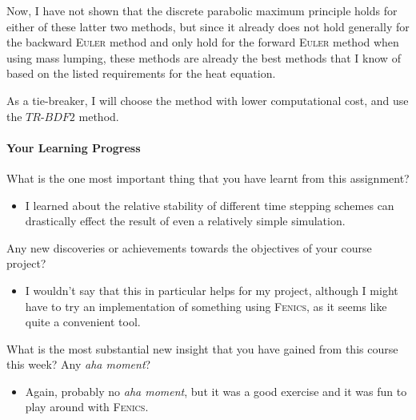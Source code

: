 \begin{solution}
Now, I have not shown that the discrete parabolic maximum principle holds for either of these latter two methods, but since it already does not hold generally for the backward \textsc{Euler} method and only hold for the forward \textsc{Euler} method when using mass lumping, these methods are already the best methods that I know of based on the listed requirements for the heat equation.

As a tie-breaker, I will choose the method with lower computational cost, and use the $TR\text{-}BDF2$ method.

\end{solution}

\newpage
\paragraph*{Your Learning Progress}%

What is the one most important thing that you have learnt from this assignment?

\vspace*{3mm}
\begin{itemize}
\item I learned about the relative stability of different time stepping schemes can drastically effect the result of even a relatively simple simulation.
\end{itemize}

\vspace*{8mm}

Any new discoveries or achievements towards the objectives of your course project?

\vspace*{3mm}
\begin{itemize}
\item I wouldn't say that this in particular helps for my project, although I might have to try an implementation of something using \textsc{Fenics}, as it seems like quite a convenient tool.
\end{itemize}

\vspace*{8mm}

What is the most substantial new insight that you have gained from this course this week? Any \emph{aha moment}?

\vspace*{3mm}
\begin{itemize}
\item Again, probably no \emph{aha moment}, but it was a good exercise and it was fun to play around with \textsc{Fenics}.
\end{itemize}

\newpage
\begin{appendices}
\lhead{}
\section{}\label{hw9Code}
\textbf{\Large{}}

\end{appendices}


